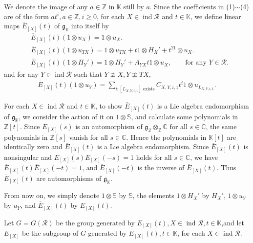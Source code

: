 \documentclass[12pt]{amsart}
\begin{document}
We denote the image of any $a\in \mathbb{Z}$ in $\mathbb{K}$ still by $a$.
Since the coefficients in (1)$\sim $(4) are of the form $at^i,a\in \mathbb{Z},i\geq 0$, for each $X\in \operatorname{ind}\mathcal{R}$ and $t\in \mathbb{K}$, we define linear maps $\overline{E}_{[X]}(t)$ of $\mathfrak{g}_{\mathbb{K}}$ into itself by
\begin{align*}
    &\overline{E}_{[X]}(t) (1\otimes u_X)=1\otimes u_X .\\
    &\overline{E}_{[X]}(t) (1\otimes u_{TX})=1\otimes u_{TX}+t1\otimes H_X'+t^21\otimes u_X .\\
    &\overline{E}_{[X]}(t)(1\otimes H_Y')=1\otimes H_Y'+A_{YX}t1\otimes u_X,   \qquad \text{for any }  Y \in \mathcal{R} .
\end{align*}
and for any $ Y\in \operatorname{ind}\mathcal{R}$ such that $ Y\ncong X,Y\ncong TX$,
\begin{align*}
    \overline{E}_{[X]}(t)(1\otimes u_Y) = \sum\limits_{i: [L_{X,Y,i,1}] \text{ exists}} C_{X,Y,i,1} t^i 1\otimes u_{L_{X,Y,i,1}}.
\end{align*}

For each $X\in \operatorname{ind}\mathcal{R}$ and $t\in \mathbb{K}$, to show $ \overline{E}_{[X]}(t)$ is a Lie algebra endomorphism of $\mathfrak{g}_{\mathbb{K}}$, we consider the action of it on $1\otimes \mathbb{S}$, and calculate some polynomials in $\mathbb{Z}[t]$.
Since $E_{[X]}(s)$ is an automorphism of $\mathfrak{g}_{\mathbb{Z}}\otimes_{\mathbb{Z}}\mathbb{C}$ for all $s\in \mathbb{C}$, the same polynomials in $\mathbb{Z}[s]$ vanish for all $s\in \mathbb{C}$. 
Hence the polynomials in $\mathbb{K}[t]$ are identically zero and $ \overline{E}_{[X]}(t)$ is a Lie algebra endomorphism.
Since $ \overline{E}_{[X]}(t)$ is nonsingular and $E_{[X]}(s)E_{[X]}(-s) = 1$ holds for all $s\in \mathbb{C}$, we have $ \overline{E}_{[X]}(t) \overline{E}_{[X]}(-t) = 1$, and $ \overline{E}_{[X]}(-t)$ is the inverse of $\overline{E}_{[X]}(t)$.
Thus $\overline{E}_{[X]}(t)$ are automorphisms of $\mathfrak{g}_{\mathbb{K}}$.

From now on, we simply denote $1\otimes \mathbb{S}$ by $\mathbb{S}$, the elements $1\otimes H_X'$ by $H_X'$, $1\otimes u_Y$ by $u_Y$, and $\overline{E}_{[X]}(t)$ by $E_{[X]}(t)$.

Let $G=G(\mathcal{R})$ be the group generated by $E_{[X]}(t), X \in \operatorname{ind}\mathcal{R}, t\in \mathbb{K}$,and let $E_{[X]}$ be the subgroup of $G$ generated by $E_{[X]}(t), t \in \mathbb{K}$, for each $X\in \operatorname{ind}\mathcal{R}$.
\end{document}
